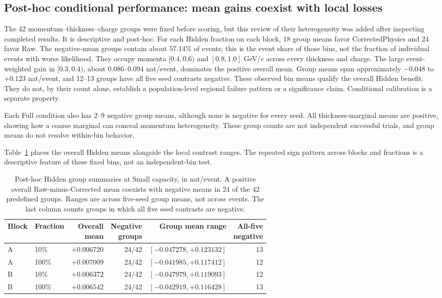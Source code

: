 \subsection{Post-hoc conditional performance: mean gains coexist with local losses}
\label{sec:local_results}

The 42 momentum--thickness--charge groups were fixed before scoring, but this
review of their heterogeneity was added after inspecting completed results.
It is descriptive and post-hoc. For each Hidden fraction on each block,
18 group means favor CorrectedPhysics and 24 favor Raw. The negative-mean
groups contain about 57.14\% of events; this is the event share of those bins,
not the fraction of individual events with worse likelihood. They occupy
momenta $[0.4,0.6)$ and $[0.8,1.0]$ GeV/$c$ across every thickness and charge.
The large event-weighted gain in $[0.3,0.4)$, about $0.086$--$0.094$ nat/event,
dominates the positive overall mean. Group means span approximately
$-0.048$ to $+0.123$ nat/event, and 12--13 groups have all five seed contrasts
negative. These observed bin means qualify the overall Hidden benefit. They do not,
by their count alone, establish a population-level regional failure pattern
or a significance claim. Conditional calibration is a separate property.

Each Full condition also has 2--9 negative group means, although none is negative
for every seed. All thickness-marginal means are positive, showing how a coarse
marginal can conceal momentum heterogeneity. These group counts are not
independent successful trials, and group means do not resolve within-bin behavior.

Table~\ref{tab:local_hidden} places the overall Hidden means alongside the
local contrast ranges. The repeated sign pattern across blocks and fractions
is a descriptive feature of these fixed bins, not an independent-bin test.

\begin{table}[t]
\centering
\caption{Post-hoc Hidden group summaries at Small capacity, in nat/event. A positive overall
Raw-minus-Corrected mean coexists with negative means in 24 of the 42
predefined groups. Ranges are across five-seed group means, not across events.
The last column counts groups in which all five seed contrasts are negative.}
\label{tab:local_hidden}
\small
\setlength{\tabcolsep}{4pt}
\begin{tabular}{llrrrr}
\toprule
Block & Fraction & \shortstack{Overall\\mean} & \shortstack{Negative\\groups} & Group mean range & \shortstack{All-five\\negative} \\
\midrule
A & 10\% & $+0.006720$ & 24/42 & $[-0.047278,+0.123132]$ & 13 \\
A & 100\% & $+0.007009$ & 24/42 & $[-0.041985,+0.117412]$ & 12 \\
B & 10\% & $+0.006372$ & 24/42 & $[-0.047979,+0.119093]$ & 12 \\
B & 100\% & $+0.006542$ & 24/42 & $[-0.042919,+0.116428]$ & 13 \\
\bottomrule
\end{tabular}
\end{table}

